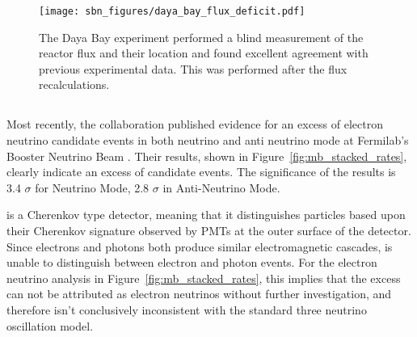 \begin{figure}[htbp]
  \centering
  \texttt{[image: sbn\_figures/daya\_bay\_flux\_deficit.pdf]}
  \caption[Daya Bay Reactor Flux]{The Daya Bay experiment performed a blind measurement of the reactor flux and their location and found excellent agreement with previous experimental data.  This was performed after the flux recalculations.}
  \label{fig:daya_bay_reactor_flux}
\end{figure}




\subsection{\label{sec:miniboone} \MB}

Most recently, the \MB collaboration published evidence for an excess of electron neutrino candidate events in both neutrino and anti neutrino mode at Fermilab's Booster Neutrino Beam \cite{Aguilar-Arevalo:2013pmq}.  Their results, shown in Figure~\ref{fig:mb_stacked_rates}, clearly indicate an excess of candidate events.  The significance of the results is 3.4 $\sigma$ for Neutrino Mode, 2.8 $\sigma$ in Anti-Neutrino Mode.

\MB is a Cherenkov type detector, meaning that it distinguishes particles based upon their Cherenkov signature observed by PMTs at the outer surface of the detector.  Since electrons and photons both produce similar electromagnetic cascades, \MB is unable to distinguish between electron and photon events.  For the electron neutrino analysis in Figure~\ref{fig:mb_stacked_rates}, this implies that the excess can not be attributed as electron neutrinos without further investigation, and therefore isn't conclusively inconsistent with the standard three neutrino oscillation model.


